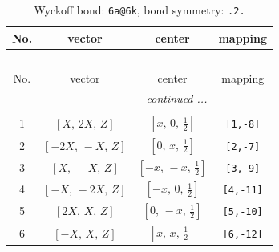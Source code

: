 \documentclass[fleqn,8pt]{jsarticle}
\begin{document}
\begin{longtable}{cccc}
\caption{Wyckoff bond: {\tt 6a@6k}, bond symmetry: {\tt .2.}}
 \\
 \hline \hline
No. & vector & center & mapping \\ \hline \endfirsthead

\multicolumn{3}{l}{\tablename\ \thetable{}} \\
 \hline \hline
No. & vector & center & mapping \\ \hline \endhead

 \hline \hline
\multicolumn{3}{r}{\footnotesize\it continued ...} \\ \endfoot

 \hline \hline
\multicolumn{3}{r}{} \\ \endlastfoot

1 & $\left[ X,\, 2 X,\, Z \right]$ & $\left[ x,\, 0,\, \frac{1}{2} \right]$ & {\tt [1,-8]} \\ \hline
2 & $\left[ - 2 X,\, - X,\, Z \right]$ & $\left[ 0,\, x,\, \frac{1}{2} \right]$ & {\tt [2,-7]} \\ \hline
3 & $\left[ X,\, - X,\, Z \right]$ & $\left[ - x,\, - x,\, \frac{1}{2} \right]$ & {\tt [3,-9]} \\ \hline
4 & $\left[ - X,\, - 2 X,\, Z \right]$ & $\left[ - x,\, 0,\, \frac{1}{2} \right]$ & {\tt [4,-11]} \\ \hline
5 & $\left[ 2 X,\, X,\, Z \right]$ & $\left[ 0,\, - x,\, \frac{1}{2} \right]$ & {\tt [5,-10]} \\ \hline
6 & $\left[ - X,\, X,\, Z \right]$ & $\left[ x,\, x,\, \frac{1}{2} \right]$ & {\tt [6,-12]} \\
\end{longtable}
\renewcommand{\arraystretch}{1.2}
\end{document}
